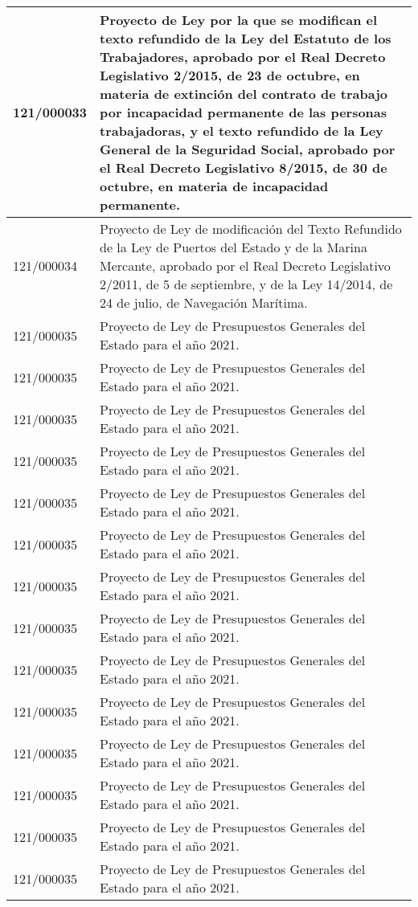{\begin{table}[H]
\begin{center}
\begin{tabularx}{\linewidth}{| l | X |}
\hline
121/000033 & Proyecto de Ley por la que se modifican el texto refundido de la Ley del Estatuto de los Trabajadores, aprobado por el Real Decreto Legislativo 2/2015, de 23 de octubre, en materia de extinción del contrato de trabajo por incapacidad permanente de las personas trabajadoras, y el texto refundido de la Ley General de la Seguridad Social, aprobado por el Real Decreto Legislativo 8/2015, de 30 de octubre, en materia de incapacidad permanente. \\
\hline
121/000034 & Proyecto de Ley de modificación del Texto Refundido de la Ley de Puertos del Estado y de la Marina Mercante, aprobado por el Real Decreto Legislativo 2/2011, de 5 de septiembre, y de la Ley 14/2014, de 24 de julio, de Navegación Marítima. \\
\hline
121/000035 & Proyecto de Ley de Presupuestos Generales del Estado para el año 2021. \\
\hline
121/000035 & Proyecto de Ley de Presupuestos Generales del Estado para el año 2021. \\
\hline
121/000035 & Proyecto de Ley de Presupuestos Generales del Estado para el año 2021. \\
\hline
121/000035 & Proyecto de Ley de Presupuestos Generales del Estado para el año 2021. \\
\hline
121/000035 & Proyecto de Ley de Presupuestos Generales del Estado para el año 2021. \\
\hline
121/000035 & Proyecto de Ley de Presupuestos Generales del Estado para el año 2021. \\
\hline
121/000035 & Proyecto de Ley de Presupuestos Generales del Estado para el año 2021. \\
\hline
121/000035 & Proyecto de Ley de Presupuestos Generales del Estado para el año 2021. \\
\hline
121/000035 & Proyecto de Ley de Presupuestos Generales del Estado para el año 2021. \\
\hline
121/000035 & Proyecto de Ley de Presupuestos Generales del Estado para el año 2021. \\
\hline
121/000035 & Proyecto de Ley de Presupuestos Generales del Estado para el año 2021. \\
\hline
121/000035 & Proyecto de Ley de Presupuestos Generales del Estado para el año 2021. \\
\hline
121/000035 & Proyecto de Ley de Presupuestos Generales del Estado para el año 2021. \\
\hline
121/000035 & Proyecto de Ley de Presupuestos Generales del Estado para el año 2021. \\

\end{tabularx}
\end{center}
\end{table}}
